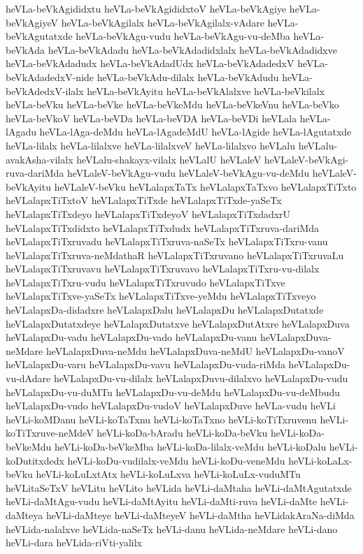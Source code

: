 {heVLa-beVkAgididxtu
heVLa-beVkAgididxtoV
heVLa-beVkAgiye
heVLa-beVkAgiyeV
heVLa-beVkAgilalx
heVLa-beVkAgilalx-vAdare
heVLa-beVkAgutatxde
heVLa-beVkAgu-vudu
heVLa-beVkAgu-vu-deMba
heVLa-beVkAda
heVLa-beVkAdadu
heVLa-beVkAdadidxlalx
heVLa-beVkAdadidxve
heVLa-beVkAdadudx
heVLa-beVkAdadUdx
heVLa-beVkAdadedxV
heVLa-beVkAdadedxV-nide
heVLa-beVkAdu-dilalx
heVLa-beVkAdudu
heVLa-beVkAdedxV-ilalx
heVLa-beVkAyitu
heVLa-beVkAlalxve
heVLa-beVkilalx
heVLa-beVku
heVLa-beVke
heVLa-beVkeMdu
heVLa-beVkeVnu
heVLa-beVko
heVLa-beVkoV
heVLa-beVDa
heVLa-beVDA
heVLa-beVDi
heVLala
heVLa-lAgadu
heVLa-lAga-deMdu
heVLa-lAgadeMdU
heVLa-lAgide
heVLa-lAgutatxde
heVLa-lilalx
heVLa-lilalxve
heVLa-lilalxveV
heVLa-lilalxvo
heVLalu
heVLalu-avakAsha-vilalx
heVLalu-shakayx-vilalx
heVLalU
heVLaleV
heVLaleV-beVkAgi-ruva-dariMda
heVLaleV-beVkAgu-vudu
heVLaleV-beVkAgu-vu-deMdu
heVLaleV-beVkAyitu
heVLaleV-beVku
heVLalapxTaTx
heVLalapxTaTxvo
heVLalapxTiTxto
heVLalapxTiTxtoV
heVLalapxTiTxde
heVLalapxTiTxde-yaSeTx
heVLalapxTiTxdeyo
heVLalapxTiTxdeyoV
heVLalapxTiTxdadxrU
heVLalapxTiTxdidxto
heVLalapxTiTxdudx
heVLalapxTiTxruva-dariMda
heVLalapxTiTxruvadu
heVLalapxTiTxruva-naSeTx
heVLalapxTiTxru-vanu
heVLalapxTiTxruva-neMdathaR
heVLalapxTiTxruvano
heVLalapxTiTxruvaLu
heVLalapxTiTxruvavu
heVLalapxTiTxruvavo
heVLalapxTiTxru-vu-dilalx
heVLalapxTiTxru-vudu
heVLalapxTiTxruvudo
heVLalapxTiTxve
heVLalapxTiTxve-yaSeTx
heVLalapxTiTxve-yeMdu
heVLalapxTiTxveyo
heVLalapxDa-didadxre
heVLalapxDalu
heVLalapxDu
heVLalapxDutatxde
heVLalapxDutatxdeye
heVLalapxDutatxve
heVLalapxDutAtxre
heVLalapxDuva
heVLalapxDu-vadu
heVLalapxDu-vado
heVLalapxDu-vanu
heVLalapxDuva-neMdare
heVLalapxDuva-neMdu
heVLalapxDuva-neMdU
heVLalapxDu-vanoV
heVLalapxDu-varu
heVLalapxDu-vavu
heVLalapxDu-vuda-riMda
heVLalapxDu-vu-dAdare
heVLalapxDu-vu-dilalx
heVLalapxDuvu-dilalxvo
heVLalapxDu-vudu
heVLalapxDu-vu-duMTu
heVLalapxDu-vu-deMdu
heVLalapxDu-vu-deMbudu
heVLalapxDu-vudo
heVLalapxDu-vudoV
heVLalapxDuve
heVLa-vudu
heVLi
heVLi-koMDanu
heVLi-koTaTxnu
heVLi-koTaTxno
heVLi-koTiTxruvenu
heVLi-koTiTxruve-neMdeV
heVLi-koDa-bAradu
heVLi-koDa-beVku
heVLi-koDa-beVkeMdu
heVLi-koDa-beVkeMba
heVLi-koDa-lilalx-veMdu
heVLi-koDalu
heVLi-koDutitxdedx
heVLi-koDu-vudilalx-veMdu
heVLi-koDu-veneMdu
heVLi-koLaLx-beVku
heVLi-koLuLxtAtx
heVLi-koLuLxva
heVLi-koLuLx-vuduMTu
heVLitaSeTxV
heVLitu
heVLito
heVLida
heVLi-daMtaha
heVLi-daMtAgutatxde
heVLi-daMtAgu-vudu
heVLi-daMtAyitu
heVLi-daMti-ruva
heVLi-daMte
heVLi-daMteya
heVLi-daMteye
heVLi-daMteyeV
heVLi-daMtha
heVLidakAraNa-diMda
heVLida-nalalxve
heVLida-naSeTx
heVLi-danu
heVLida-neMdare
heVLi-dano
heVLi-dara
heVLida-riVti-yalilx
}
